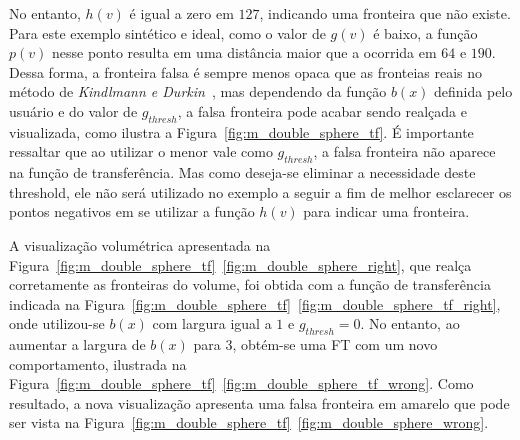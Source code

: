 	No entanto, $ h(v) $ é igual a zero em $ 127 $, indicando uma fronteira que não existe. Para este exemplo sintético e ideal, como o valor de $ g(v) $ é baixo, a função $ p(v) $ nesse ponto resulta em uma distância maior que a ocorrida em $ 64 $ e $ 190 $. Dessa forma, a fronteira falsa é sempre menos opaca que as fronteias reais no método de \textit{Kindlmann e Durkin}~\cite{gordon}, mas dependendo da função $ b(x) $ definida pelo usuário e do valor de $ g_{thresh} $, a falsa fronteira pode acabar sendo realçada e visualizada, como ilustra a Figura~\ref{fig:m_double_sphere_tf}. É importante ressaltar que ao utilizar o menor vale como $ g_{thresh} $, a falsa fronteira não aparece na função de transferência. Mas como deseja-se eliminar a necessidade deste threshold, ele não será utilizado no exemplo a seguir a fim de melhor esclarecer os pontos negativos em se utilizar a função $ h(v) $ para indicar uma fronteira.
	
	A visualização volumétrica apresentada na Figura~\ref{fig:m_double_sphere_tf}~\ref{fig:m_double_sphere_right}, que realça corretamente as fronteiras do volume, foi obtida com a função de transferência indicada na Figura~\ref{fig:m_double_sphere_tf}~\ref{fig:m_double_sphere_tf_right}, onde utilizou-se $ b(x) $ com largura igual a $ 1 $ e $ g_{thresh} = 0 $. No entanto, ao aumentar a largura de $ b(x) $ para $ 3 $, obtém-se uma FT com um novo comportamento, ilustrada na Figura~\ref{fig:m_double_sphere_tf}~\ref{fig:m_double_sphere_tf_wrong}. Como resultado, a nova visualização apresenta uma falsa fronteira em amarelo que pode ser vista na Figura~\ref{fig:m_double_sphere_tf}~\ref{fig:m_double_sphere_wrong}.

